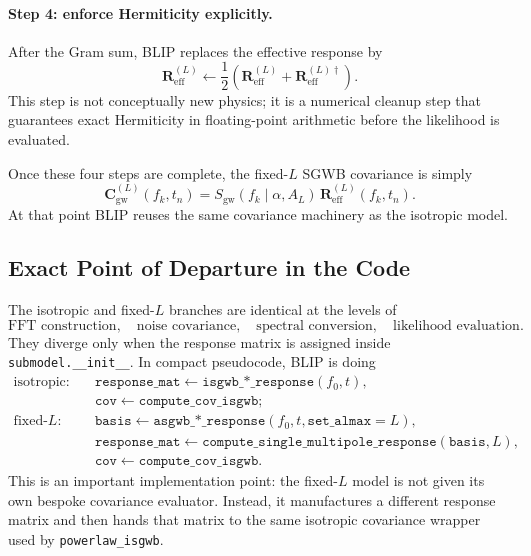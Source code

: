 \documentclass[11pt]{article}
\begin{document}
\paragraph{Step 4: enforce Hermiticity explicitly.}
After the Gram sum, BLIP replaces the effective response by
\begin{equation}
\mathbf{R}^{(L)}_{\mathrm{eff}}
\leftarrow
\frac{1}{2}\left(
\mathbf{R}^{(L)}_{\mathrm{eff}}
+\mathbf{R}^{(L)\dagger}_{\mathrm{eff}}
\right).
\end{equation}
This step is not conceptually new physics; it is a numerical cleanup step that guarantees exact Hermiticity in floating-point arithmetic before the likelihood is evaluated.

Once these four steps are complete, the fixed-$L$ SGWB covariance is simply
\begin{equation}
\mathbf{C}^{(L)}_{\mathrm{gw}}(f_k,t_n)
=S_{\mathrm{gw}}(f_k\mid \alpha,A_L)\,
\mathbf{R}^{(L)}_{\mathrm{eff}}(f_k,t_n).
\end{equation}
At that point BLIP reuses the same covariance machinery as the isotropic model.

\subsection{Exact Point of Departure in the Code}
The isotropic and fixed-$L$ branches are identical at the levels of
\begin{equation}
\text{FFT construction},\quad
\text{noise covariance},\quad
\text{spectral conversion},\quad
\text{likelihood evaluation}.
\end{equation}
They diverge only when the response matrix is assigned inside \texttt{submodel.\_\_init\_\_}. In compact pseudocode, BLIP is doing
\begin{align}
\text{isotropic:}\quad
&\texttt{response\_mat} \leftarrow \texttt{isgwb\_*\_response}(f_0,t), \\
&\texttt{cov} \leftarrow \texttt{compute\_cov\_isgwb}; \\
\text{fixed-}L:\quad
&\texttt{basis} \leftarrow \texttt{asgwb\_*\_response}(f_0,t,\texttt{set\_almax}=L), \\
&\texttt{response\_mat} \leftarrow \texttt{compute\_single\_multipole\_response}(\texttt{basis},L), \\
&\texttt{cov} \leftarrow \texttt{compute\_cov\_isgwb}.
\end{align}
This is an important implementation point: the fixed-$L$ model is not given its own bespoke covariance evaluator. Instead, it manufactures a different response matrix and then hands that matrix to the same isotropic covariance wrapper used by \texttt{powerlaw\_isgwb}.
\end{document}
